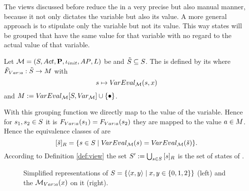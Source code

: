 \documentclass[preview]{standalone}
\begin{document}
The views discussed before reduce the \chgphN in a very precise but also manual manner, because it not only dictates the variable but also its value. A more general approach is to stipulate only the variable but not its value. This way states will be grouped that have the same value for that variable with no regard to the actual value of that variable. 

\begin{definition}
	Let ${{{\mathcal{M}}}} = {{({S}, {Act}, {\textbf{P}}, {\iota_{init}}, {AP}, {L})}}$ be \achgphN and ${\tilde{{S}}} \subseteq {S}$. The \viewN \viewparamvalident is defined by its \grpfctN \gfctparamvalident where ${{\tilde{F}_{{Var:{a}}}}} : {\tilde{{S}}} \to {\ensuremath{{M}}}$ with
	\[
	{s} \mapsto {V\!arEval_{\ensuremath{{{\mathcal{M}}}}}}({s},{x})
	\]
	and ${{M}} := {{V\!arEval_{{{\mathcal{M}}}}}[{S},{V\!ar_{{{\mathcal{M}}}}}]} \cup \{{\bullet}\}$.
\end{definition}

With this grouping function we directly map to the value of the variable. Hence for ${s}_1, {s}_2 \in {S}$ it is ${{F_{{Var:{a}}}}}({s}_1) = {{F_{{Var:{a}}}}}({s}_2)$ \iffN they are mapped to the value ${a} \in {\ensuremath{{M}}}$. Hence the equivalence classes of \eqrelview are
\[
{{[{\tilde{{s}}}]_{{R}}}} = \{ {s} \in {S} \mid {V\!arEval_{\ensuremath{{{\mathcal{M}}}}}}({s}) = {V\!arEval_{{{\mathcal{M}}}}}({\tilde{{s}}})\}.
\]
According to Definition \ref{def:view} the set ${S}' := \bigcup_{{s} \in {S}} {{[{s}]_{{R}}}}$ is the set of states of \viewparamvalident.

\begin{figure}[h]
	\begin{minipage}{.6\textwidth}
		
	\end{minipage}%
	\begin{minipage}{.5\textwidth}
		
	\end{minipage}
	\caption{Simplified representations of \mdp ${S} = \{{\langle x,y\rangle} \mid x,y \in \{0, 1, 2\}\}$ (left) and the \viewN ${{{{{\mathcal{M}}}}_{{Var:{a}}}}}(x)$ on it (right).}
	\label{fig:varValIdent}  
\end{figure}
\end{document}
